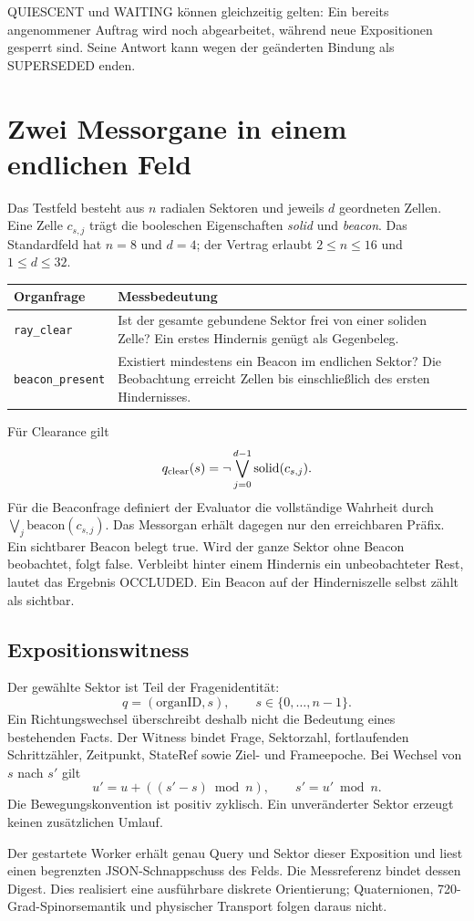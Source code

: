 \documentclass[11pt,a4paper]{article}
\newcommand{\nextsection}[2]{\clearpage{\color{accent}\small\textsf{#1}}\section{#2}}
\begin{document}
QUIESCENT und WAITING können gleichzeitig gelten: Ein bereits
angenommener Auftrag wird noch abgearbeitet, während neue
Expositionen gesperrt sind. Seine Antwort kann wegen der
geänderten Bindung als SUPERSEDED enden.

\nextsection{23 / AUSFÜHRBARE EXPOSITION}{Zwei Messorgane in einem endlichen Feld}
Das Testfeld besteht aus $n$ radialen Sektoren und jeweils $d$
geordneten Zellen. Eine Zelle $c_{s,j}$ trägt die booleschen
Eigenschaften \emph{solid} und \emph{beacon}. Das Standardfeld
hat $n=8$ und $d=4$; der Vertrag erlaubt $2\leq n\leq16$ und
$1\leq d\leq32$.

\begin{tabularx}{\linewidth}{@{}lY@{}}
\toprule
Organfrage & Messbedeutung\\\midrule
\texttt{ray\_clear} & Ist der gesamte gebundene Sektor frei von
einer soliden Zelle? Ein erstes Hindernis genügt als Gegenbeleg.\\
\texttt{beacon\_present} & Existiert mindestens ein Beacon im
endlichen Sektor? Die Beobachtung erreicht Zellen bis einschließlich
des ersten Hindernisses.\\
\bottomrule
\end{tabularx}

Für Clearance gilt
\[
q_{\rm clear}(s)=\neg\bigvee_{j=0}^{d-1}\mathrm{solid}(c_{s,j}).
\]
Für die Beaconfrage definiert der Evaluator die vollständige
Wahrheit durch $\bigvee_j\mathrm{beacon}(c_{s,j})$. Das
Messorgan erhält dagegen nur den erreichbaren Präfix.
Ein sichtbarer Beacon belegt true. Wird der ganze Sektor
ohne Beacon beobachtet, folgt false. Verbleibt hinter einem
Hindernis ein unbeobachteter Rest, lautet das Ergebnis OCCLUDED.
Ein Beacon auf der Hinderniszelle selbst zählt als sichtbar.

\subsection{Expositionswitness}
Der gewählte Sektor ist Teil der Fragenidentität:
\[
q=(\mathrm{organID},s),\qquad s\in\{0,\ldots,n-1\}.
\]
Ein Richtungswechsel überschreibt deshalb nicht die Bedeutung
eines bestehenden Facts. Der Witness bindet Frage, Sektorzahl,
fortlaufenden Schrittzähler, Zeitpunkt, StateRef sowie Ziel-
und Frameepoche. Bei Wechsel von $s$ nach $s'$ gilt
\[
u'=u+((s'-s)\bmod n),\qquad s'=u'\bmod n.
\]
Die Bewegungskonvention ist positiv zyklisch. Ein unveränderter
Sektor erzeugt keinen zusätzlichen Umlauf.

Der gestartete Worker erhält genau Query und Sektor dieser
Exposition und liest einen begrenzten JSON-Schnappschuss des
Felds. Die Messreferenz bindet dessen Digest. Dies realisiert
eine ausführbare diskrete Orientierung; Quaternionen,
720-Grad-Spinorsemantik und physischer Transport folgen daraus nicht.
\end{document}
